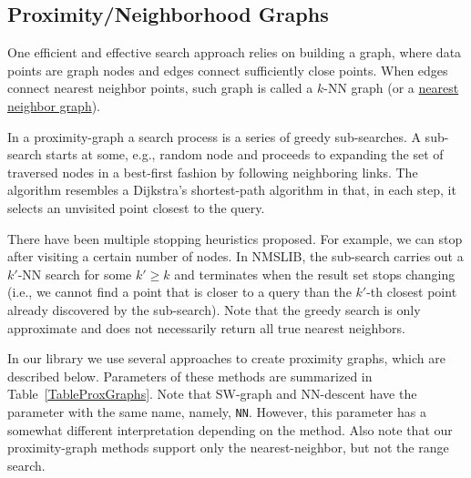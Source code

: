 \documentclass[runningheads,a4paper]{llncs}
\newcommand{\ttt}[1]{\texttt{#1}}
\newcommand{\knn}{$k$-NN }
\begin{document}
\subsection{Proximity/Neighborhood Graphs} \label{SectionProxGraph}
One efficient and effective search approach
relies on building a graph, where data points are graph nodes and edges connect sufficiently close points.
When edges connect nearest neighbor points, such graph is called a \knn graph (or a \href{https://en.wikipedia.org/wiki/Nearest_neighbor_graph}{nearest neighbor graph}).

In a proximity-graph a search process is a series of greedy sub-searches.
A sub-search starts at some, e.g., random node and proceeds to expanding the set of traversed nodes in a best-first fashion by following neighboring links. 
The algorithm resembles a Dijkstra's shortest-path algorithm in that, in each step, 
it selects an unvisited point closest to the query. 

There have been multiple stopping heuristics proposed.
For example, we can stop after visiting a certain number of nodes.
In NMSLIB, the sub-search carries out a $k'$-NN search for some $k'\ge k$ and
terminates when the result set stops changing (i.e., we cannot find a point that is closer to a query than the $k'$-th closest point
already discovered by the sub-search).
Note that the greedy search is only approximate and does not necessarily return all true nearest neighbors.

In our library we use several approaches to create proximity graphs, which are described below.
Parameters of these methods are summarized in Table~\ref{TableProxGraphs}.
Note that SW-graph and NN-descent have the parameter with the same name, namely, \ttt{NN}.
However, this parameter has a somewhat different interpretation depending on the method.
Also note that our proximity-graph methods support only the nearest-neighbor, but not the range search.
\end{document}
